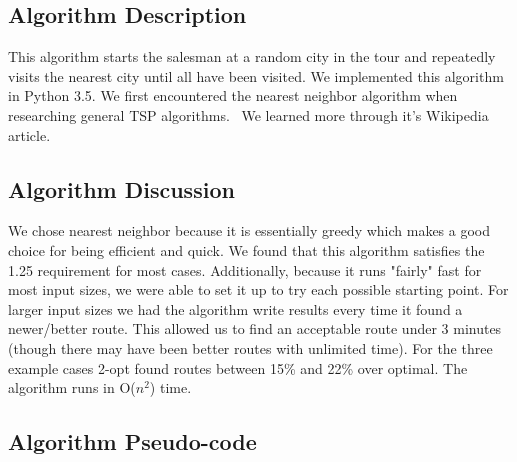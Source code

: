 \documentclass[../report/main.tex]{subfiles}
\begin{document}
\subsection*{Algorithm Description}

This algorithm starts the salesman at a random city in the tour and repeatedly visits the nearest city until all have been visited. We implemented this algorithm in Python 3.5.  We first encountered the nearest neighbor algorithm when researching general TSP algorithms.~\cite{wikipediaTSP} We learned more through it's Wikipedia article.~\cite{wikipediaNN}

\subsection*{Algorithm Discussion}

We chose nearest neighbor because it is essentially greedy which makes a good choice for being efficient and quick. We found that this algorithm satisfies the 1.25 requirement for most cases.  Additionally, because it runs "fairly" fast for most input sizes, we were able to set it up to try each possible starting point.  For larger input sizes we had the algorithm write results every time it found a newer/better route.  This allowed us to find an acceptable route under 3 minutes (though there may have been better routes with unlimited time).  For the three example cases 2-opt found routes between 15\% and 22\% over optimal.  The algorithm runs in O($n^2$) time.

\subsection*{Algorithm Pseudo-code}
\end{document}
